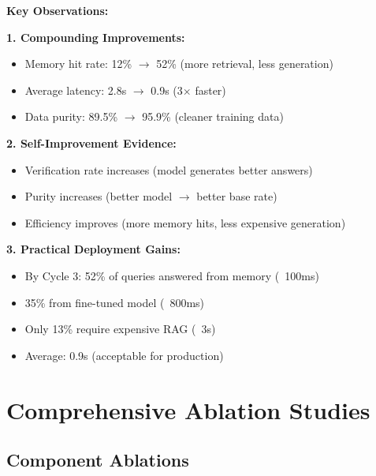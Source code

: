 \documentclass[12pt,a4paper]{article}
\theoremstyle{definition}
\begin{document}
\begin{keyinsightbox}
\textbf{Key Observations:}

\textbf{1. Compounding Improvements:}
\begin{itemize}
    \item Memory hit rate: 12\% $\rightarrow$ 52\% (more retrieval, less generation)
    \item Average latency: 2.8s $\rightarrow$ 0.9s (3$\times$ faster)
    \item Data purity: 89.5\% $\rightarrow$ 95.9\% (cleaner training data)
\end{itemize}

\textbf{2. Self-Improvement Evidence:}
\begin{itemize}
    \item Verification rate increases (model generates better answers)
    \item Purity increases (better model $\rightarrow$ better base rate)
    \item Efficiency improves (more memory hits, less expensive generation)
\end{itemize}

\textbf{3. Practical Deployment Gains:}
\begin{itemize}
    \item By Cycle 3: 52\% of queries answered from memory (~100ms)
    \item 35\% from fine-tuned model (~800ms)
    \item Only 13\% require expensive RAG (~3s)
    \item Average: 0.9s (acceptable for production)
\end{itemize}
\end{keyinsightbox}

\newpage

\section{Comprehensive Ablation Studies}

\subsection{Component Ablations}
\end{document}
